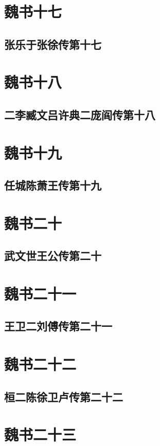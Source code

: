 \documentclass[12pt,UTF8]{ctexbook}
\begin{document}
\part{魏书十七}
\chapter{张乐于张徐传第十七}

\part{魏书十八}
\chapter{二李臧文吕许典二庞阎传第十八}

\part{魏书十九}
\chapter{任城陈萧王传第十九}

\part{魏书二十}
\chapter{武文世王公传第二十}

\part{魏书二十一}
\chapter{王卫二刘傅传第二十一}

\part{魏书二十二}
\chapter{桓二陈徐卫卢传第二十二}

\part{魏书二十三}
\end{document}
